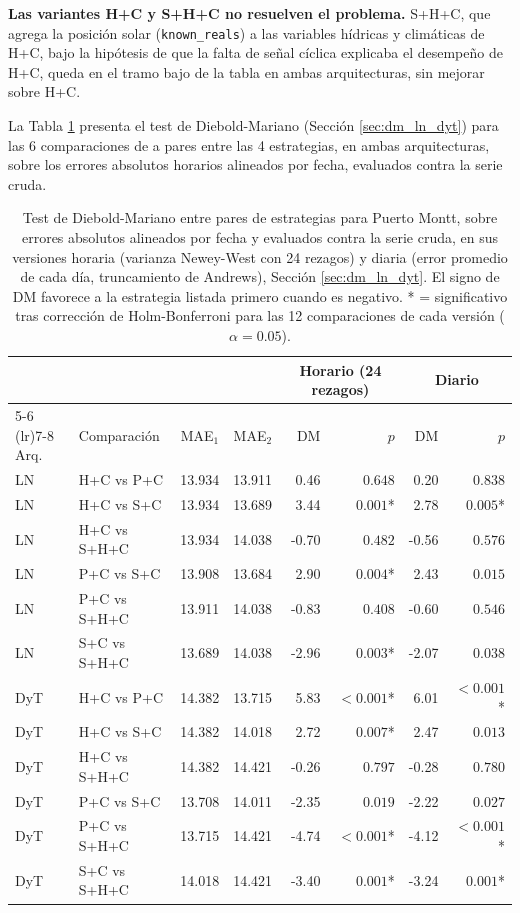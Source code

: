 \textbf{Las variantes H+C y S+H+C no resuelven el problema.} S+H+C, que agrega la posición solar (\texttt{known\_reals}) a las variables hídricas y climáticas de H+C, bajo la hipótesis de que la falta de señal cíclica explicaba el desempeño de H+C, queda en el tramo bajo de la tabla en ambas arquitecturas, sin mejorar sobre H+C.

La Tabla \ref{tab:pmontt_dm} presenta el test de Diebold-Mariano (Sección \ref{sec:dm_ln_dyt}) para las 6 comparaciones de a pares entre las 4 estrategias, en ambas arquitecturas, sobre los errores absolutos horarios alineados por fecha, evaluados contra la serie cruda.

\begin{table}[htbp]
    \centering
    \small
    \begin{tabular}{llrrrrrr}
        \toprule
        & & & & \multicolumn{2}{c}{Horario (24 rezagos)} & \multicolumn{2}{c}{Diario} \\
        \cmidrule(lr){5-6} \cmidrule(lr){7-8}
        Arq. & Comparación & MAE$_1$ & MAE$_2$ & DM & $p$ & DM & $p$ \\
        \midrule
        LN  & H+C vs P+C   & 13.934 & 13.911 & 0.46 & $0.648$ & 0.20 & $0.838$ \\
        LN  & H+C vs S+C   & 13.934 & 13.689 & 3.44 & $0.001$* & 2.78 & $0.005$* \\
        LN  & H+C vs S+H+C & 13.934 & 14.038 & -0.70 & $0.482$ & -0.56 & $0.576$ \\
        LN  & P+C vs S+C   & 13.908 & 13.684 & 2.90 & $0.004$* & 2.43 & $0.015$ \\
        LN  & P+C vs S+H+C & 13.911 & 14.038 & -0.83 & $0.408$ & -0.60 & $0.546$ \\
        LN  & S+C vs S+H+C & 13.689 & 14.038 & -2.96 & $0.003$* & -2.07 & $0.038$ \\
        DyT & H+C vs P+C   & 14.382 & 13.715 & 5.83 & $<0.001$* & 6.01 & $<0.001$* \\
        DyT & H+C vs S+C   & 14.382 & 14.018 & 2.72 & $0.007$* & 2.47 & $0.013$ \\
        DyT & H+C vs S+H+C & 14.382 & 14.421 & -0.26 & $0.797$ & -0.28 & $0.780$ \\
        DyT & P+C vs S+C   & 13.708 & 14.011 & -2.35 & $0.019$ & -2.22 & $0.027$ \\
        DyT & P+C vs S+H+C & 13.715 & 14.421 & -4.74 & $<0.001$* & -4.12 & $<0.001$* \\
        DyT & S+C vs S+H+C & 14.018 & 14.421 & -3.40 & $0.001$* & -3.24 & $0.001$* \\
        \bottomrule
    \end{tabular}
    \caption{Test de Diebold-Mariano entre pares de estrategias para Puerto Montt, sobre errores absolutos alineados por fecha y evaluados contra la serie cruda, en sus versiones horaria (varianza Newey-West con 24 rezagos) y diaria (error promedio de cada día, truncamiento de Andrews), Sección \ref{sec:dm_ln_dyt}. El signo de DM favorece a la estrategia listada primero cuando es negativo. * = significativo tras corrección de Holm-Bonferroni para las 12 comparaciones de cada versión ($\alpha=0.05$).}
    \label{tab:pmontt_dm}
\end{table}

